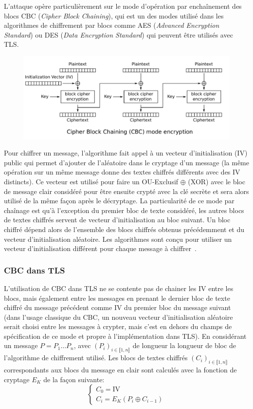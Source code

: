 \documentclass[a4paper,twoside]{article}
\begin{document}
L'attaque opère particulièrement sur le mode d'opération par enchaînement
des blocs CBC (\emph{Cipher Block Chaining}), qui est un des modes utilisé
dans les algorithmes de chiffrement par blocs comme AES (\emph{Advanced
Encryption Standard}) ou DES (\emph{Data Encryption Standard}) qui peuvent
être utilisés avec TLS.

\begin{figure}[H]
    \centering
    \includegraphics[width=.75\textwidth]{CBC-encryption}
\end{figure}

Pour chiffrer un message, l'algorithme fait appel à un vecteur
d'initialisation (IV) public qui permet d'ajouter de l'aléatoire dans le
cryptage d'un message (la même opération sur un même message donne des
textes chiffrés différents avec des IV distincts). Ce vecteur est utilisé
pour faire un OU-Exclusif $\oplus$ (XOR) avec le bloc de message clair
considéré pour être ensuite crypté avec la clé secrète et sera alors utilisé
de la même façon après le décryptage. La particularité de ce mode par
chaînage est qu'à l'exception du premier bloc de texte considéré, les autres
blocs de textes chiffrés servent de vecteur d'initialisation au bloc
suivant. Un bloc chiffré dépend alors de l'ensemble des blocs chiffrés
obtenus précédemment et du vecteur d'initialisation aléatoire. Les
algorithmes sont conçu pour utiliser un vecteur d'initialisation différent
pour chaque message à chiffrer~\cite{Wikipedia:BCMO}.

\subsubsection{CBC dans TLS}

L'utilisation de CBC dans TLS ne se contente pas de chainer les IV entre les
blocs, mais également entre les messages en prenant le dernier bloc de texte
chiffré du message précédent comme IV du premier bloc du message suivant
(dans l'usage classique du CBC, un nouveau vecteur d'initialisation
aléatoire serait choisi entre les messages à crypter, mais c'est en dehors
du champs de spécification de ce mode et propre à l'implémentation dans
TLS). En considérant un message $P = P_1\ldots P_n$, avec ${(P_i)}_{i\in
\llbracket 1, n \rrbracket}$ de longueur la longueur de bloc de l'algorithme
de chiffrement utilisé. Les blocs de textes chiffrés ${(C_i)}_{i\in
\llbracket 1, n \rrbracket}$ correspondants aux blocs du message en clair
sont calculés avec la fonction de cryptage $E_K$ de la façon suivante:
\begin{equation}
    \label{eq:encryption}
    \left\{\begin{array}{ll}
	C_0 = \text{IV}\\
	C_i = E_K (P_i \oplus C_{i-1})
    \end{array}\right.
\end{equation}
\end{document}
